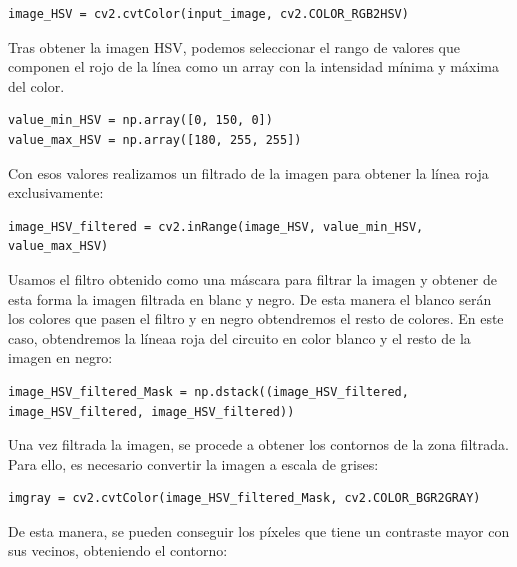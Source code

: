 \lstset{language=Python, breaklines=true, basicstyle=\footnotesize}
\begin{lstlisting}[frame=single]
image_HSV = cv2.cvtColor(input_image, cv2.COLOR_RGB2HSV)
\end{lstlisting}

Tras obtener la imagen HSV, podemos seleccionar el rango de valores que componen el rojo de la línea como un array con la intensidad mínima y máxima del color.

\lstset{language=Python, breaklines=true, basicstyle=\footnotesize}
\begin{lstlisting}[frame=single]
value_min_HSV = np.array([0, 150, 0])
value_max_HSV = np.array([180, 255, 255])
\end{lstlisting}

Con esos valores realizamos un filtrado de la imagen para obtener la línea roja exclusivamente:

\lstset{language=Python, breaklines=true, basicstyle=\footnotesize}
\begin{lstlisting}[frame=single]
image_HSV_filtered = cv2.inRange(image_HSV, value_min_HSV, value_max_HSV)
\end{lstlisting}

Usamos el filtro obtenido como una máscara para filtrar la imagen y obtener de esta forma la imagen filtrada en blanc y negro. De esta manera el blanco serán los colores que pasen el filtro y en negro obtendremos el resto de colores. En este caso, obtendremos la líneaa roja del circuito en color blanco y el resto de la imagen en negro:

\lstset{language=Python, breaklines=true, basicstyle=\footnotesize}
\begin{lstlisting}[frame=single]
image_HSV_filtered_Mask = np.dstack((image_HSV_filtered, image_HSV_filtered, image_HSV_filtered))
\end{lstlisting}

Una vez filtrada la imagen, se procede a obtener los contornos de la zona filtrada. Para ello, es necesario convertir la imagen a escala de grises:

\lstset{language=Python, breaklines=true, basicstyle=\footnotesize}
\begin{lstlisting}[frame=single]
imgray = cv2.cvtColor(image_HSV_filtered_Mask, cv2.COLOR_BGR2GRAY)
\end{lstlisting}

De esta manera, se pueden conseguir los píxeles que tiene un contraste mayor con sus vecinos, obteniendo el contorno:

